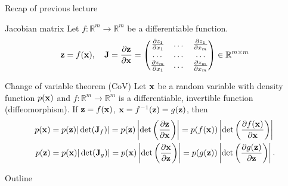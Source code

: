 \begin{frame}{Recap of previous lecture}
	\begin{block}{Jacobian matrix}
		Let $f: \mathbb{R}^m \rightarrow \mathbb{R}^m$ be a differentiable function.
		\[
		\mathbf{z} = f(\mathbf{x}), \quad 
		\mathbf{J} =  \frac{\partial \mathbf{z}}{\partial \mathbf{x}} =
		\begin{pmatrix}
			\frac{\partial z_1}{\partial x_1} & \dots & \frac{\partial z_1}{\partial x_m} \\
			\dots & \dots & \dots \\ 
			\frac{\partial z_m}{\partial x_1} & \dots & \frac{\partial z_m}{\partial x_m}
		\end{pmatrix} \in \mathbb{R}^{m \times m}
		\]
		\vspace{-0.3cm}
	\end{block}
	\begin{block}{Change of variable theorem (CoV)}
		Let $\mathbf{x}$ be a random variable with density function $p(\mathbf{x})$ and $f: \mathbb{R}^m \rightarrow \mathbb{R}^m$ is a differentiable, invertible function (diffeomorphism). If $\mathbf{z} = f(\mathbf{x})$, $\mathbf{x} = f^{-1}(\mathbf{z}) = g(\mathbf{z})$, then
		\begin{align*}
			p(\mathbf{x}) &= p(\mathbf{z}) |\det(\mathbf{J}_f)| = p(\mathbf{z}) \left|\det \left(  \frac{\partial \mathbf{z}}{\partial \mathbf{x}} \right) \right| = p(f(\mathbf{x})) \left|\det \left(  \frac{\partial f(\mathbf{x})}{\partial \mathbf{x}} \right) \right| \\
			p(\mathbf{z}) &= p(\mathbf{x}) |\det(\mathbf{J}_g)|= p(\mathbf{x}) \left|\det \left(  \frac{\partial \mathbf{x}}{\partial \mathbf{z}} \right) \right| = p(g(\mathbf{z})) \left|\det \left(  \frac{\partial g(\mathbf{z})}{\partial \mathbf{z}} \right) \right|.
		\end{align*}
		\vspace{-0.5cm}
	\end{block}
\end{frame}
\begin{frame}{Outline}
	\tableofcontents
\end{frame}
